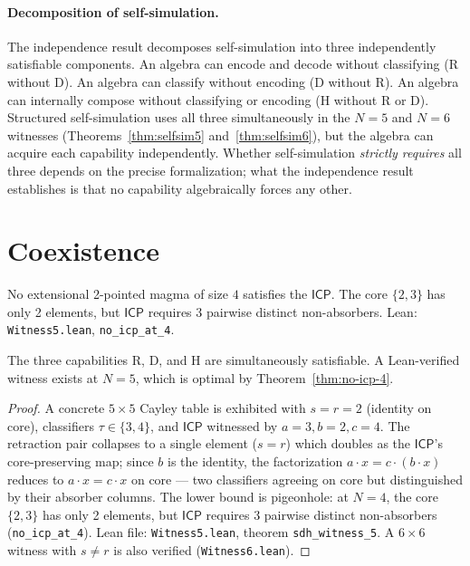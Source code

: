 \documentclass[sigconf,screen,review,anonymous]{acmart}
\newcommand{\ICP}{\textsf{ICP}}
\theoremstyle{remark}
\begin{document}
\paragraph{Decomposition of self-simulation.}
The independence result decomposes self-simulation into three independently satisfiable components. An algebra can encode and decode without classifying (R without D). An algebra can classify without encoding (D without R). An algebra can internally compose without classifying or encoding (H without R or D). Structured self-simulation uses all three simultaneously in the $N\!=\!5$ and $N\!=\!6$ witnesses (Theorems~\ref{thm:selfsim5} and~\ref{thm:selfsim6}), but the algebra can acquire each capability independently. Whether self-simulation \emph{strictly requires} all three depends on the precise formalization; what the independence result establishes is that no capability algebraically forces any other.

\section{Coexistence}
\label{sec:bound}

\begin{theorem}[No ICP at $N\!=\!4$]
\label{thm:no-icp-4}
No extensional 2-pointed magma of size $4$ satisfies the $\ICP$. The core $\{2,3\}$ has only 2 elements, but $\ICP$ requires 3 pairwise distinct non-absorbers. Lean: \texttt{Witness5.lean}, \texttt{no\_icp\_at\_4}.
\end{theorem}

\begin{theorem}
\label{thm:bound}
The three capabilities R, D, and H are simultaneously satisfiable. A Lean-verified witness exists at $N\!=\!5$, which is optimal by Theorem~\ref{thm:no-icp-4}.
\end{theorem}

\begin{proof}
A concrete $5 \times 5$ Cayley table is exhibited with $s\!=\!r\!=\!2$ (identity on core), classifiers $\tau \in \{3,4\}$, and $\ICP$ witnessed by $a\!=\!3, b\!=\!2, c\!=\!4$. The retraction pair collapses to a single element ($s\!=\!r$) which doubles as the $\ICP$'s core-preserving map; since $b$ is the identity, the factorization $a \cdot x = c \cdot (b \cdot x)$ reduces to $a \cdot x = c \cdot x$ on core --- two classifiers agreeing on core but distinguished by their absorber columns. The lower bound is pigeonhole: at $N\!=\!4$, the core $\{2,3\}$ has only 2 elements, but $\ICP$ requires 3 pairwise distinct non-absorbers (\texttt{no\_icp\_at\_4}). Lean file: \texttt{Witness5.lean}, theorem \texttt{sdh\_witness\_5}. A $6 \times 6$ witness with $s \neq r$ is also verified (\texttt{Witness6.lean}).
\end{proof}
\end{document}

